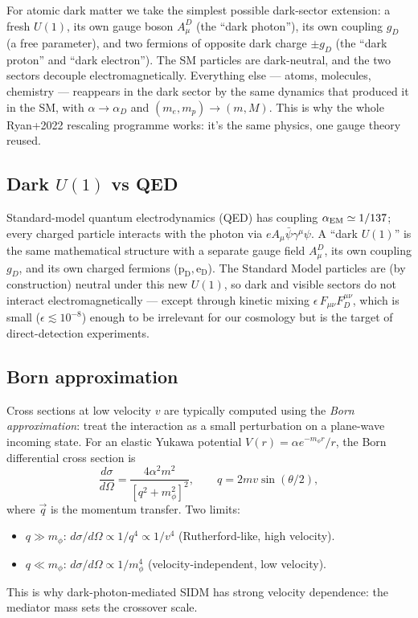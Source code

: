 \documentclass[12pt]{article}
\newcommand{\pD}{\mathrm{p_D}}
\newcommand{\eD}{\mathrm{e_D}}
\begin{document}
For atomic dark matter we take the simplest possible dark-sector
extension: a fresh $U(1)$, its own gauge boson $A_\mu^D$ (the
``dark photon''), its own coupling $g_D$ (a free parameter),
and two fermions of opposite dark charge $\pm g_D$ (the ``dark
proton'' and ``dark electron'').  The SM particles are dark-neutral,
and the two sectors decouple electromagnetically.  Everything else
--- atoms, molecules, chemistry --- reappears in the dark sector by
the same dynamics that produced it in the SM, with $\alpha \to
\alpha_D$ and $(m_e, m_p) \to (m, M)$.  This is why the whole
Ryan+2022 rescaling programme works: it's the same physics, one gauge
theory reused.

\subsection{Dark $U(1)$ vs QED}

Standard-model quantum electrodynamics (QED) has coupling
$\alpha_{\rm EM} \simeq 1/137$; every charged particle interacts with
the photon via $e A_\mu \bar\psi\gamma^\mu\psi$.  A ``dark $U(1)$'' is
the same mathematical structure with a separate gauge field
$A_\mu^D$, its own coupling $g_D$, and its own charged fermions
($\pD, \eD$).  The Standard Model particles are (by construction)
neutral under this new $U(1)$, so dark and visible sectors do not
interact electromagnetically --- except through kinetic mixing
$\epsilon\,F_{\mu\nu}F_D^{\mu\nu}$, which is small ($\epsilon\lesssim
10^{-8}$) enough to be irrelevant for our cosmology but is the target
of direct-detection experiments.

\subsection{Born approximation}

Cross sections at low velocity $v$ are typically computed using the
\emph{Born approximation}: treat the interaction as a small
perturbation on a plane-wave incoming state.  For an elastic Yukawa
potential $V(r) = \alpha e^{-m_\phi r}/r$, the Born differential
cross section is
%
\begin{equation}
  \frac{d\sigma}{d\Omega}
    = \frac{4\alpha^2 m^2}{[q^2 + m_\phi^2]^2},
  \qquad
  q = 2m v\sin(\theta/2),
\end{equation}
%
where $\vec q$ is the momentum transfer.  Two limits:
%
\begin{itemize}
  \item $q\gg m_\phi$: $d\sigma/d\Omega \propto 1/q^4 \propto 1/v^4$
        (Rutherford-like, high velocity).
  \item $q\ll m_\phi$: $d\sigma/d\Omega \propto 1/m_\phi^4$
        (velocity-independent, low velocity).
\end{itemize}
%
This is why dark-photon-mediated SIDM has strong velocity dependence:
the mediator mass sets the crossover scale.


\end{document}
